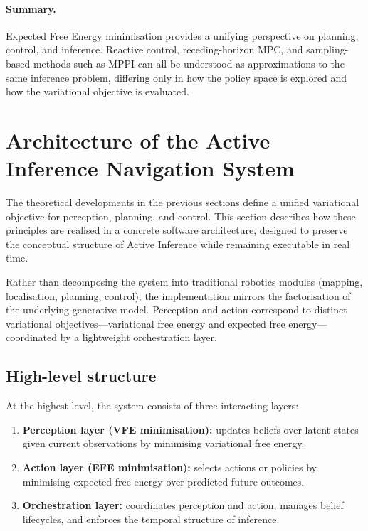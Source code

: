 \documentclass[a4paper, twoside]{article}
\begin{document}
\paragraph{Summary.}
Expected Free Energy minimisation provides a unifying perspective on planning,
control, and inference. Reactive control, receding-horizon MPC, and sampling-based
methods such as MPPI can all be understood as approximations to the same
inference problem, differing only in how the policy space is explored and how
the variational objective is evaluated.

\section{Architecture of the Active Inference Navigation System}
\label{sec:architecture}

The theoretical developments in the previous sections define a unified variational objective for perception,
planning, and control. This section describes how these principles are realised in a concrete software
architecture, designed to preserve the conceptual structure of Active Inference while remaining executable
in real time.

Rather than decomposing the system into traditional robotics modules (mapping, localisation, planning,
control), the implementation mirrors the factorisation of the underlying generative model. Perception and
action correspond to distinct variational objectives—variational free energy and expected free energy—
coordinated by a lightweight orchestration layer.

\subsection{High-level structure}

At the highest level, the system consists of three interacting layers:

\begin{enumerate}
    \item \textbf{Perception layer (VFE minimisation):} updates beliefs over latent states given current
    observations by minimising variational free energy.
    
    \item \textbf{Action layer (EFE minimisation):} selects actions or policies by minimising expected free
    energy over predicted future outcomes.
    
    \item \textbf{Orchestration layer:} coordinates perception and action, manages belief lifecycles, and
    enforces the temporal structure of inference.
\end{enumerate}
\end{document}
